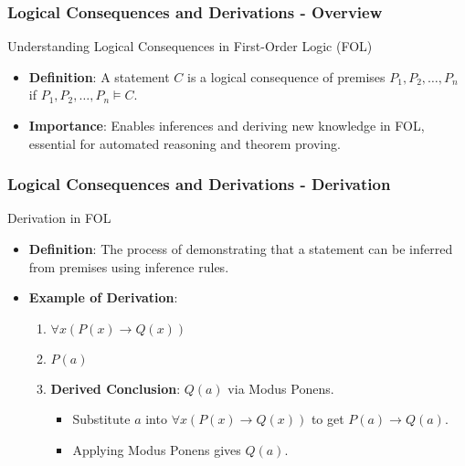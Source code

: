 \documentclass[aspectratio=169]{beamer}
\begin{document}
\begin{frame}[fragile]
    \frametitle{Logical Consequences and Derivations - Overview}
    \begin{block}{Understanding Logical Consequences in First-Order Logic (FOL)}
        \begin{itemize}
            \item \textbf{Definition}: A statement \(C\) is a logical consequence of premises \(P_1, P_2, \ldots, P_n\) if \( P_1, P_2, \ldots, P_n \models C \).
            \item \textbf{Importance}: Enables inferences and deriving new knowledge in FOL, essential for automated reasoning and theorem proving.
        \end{itemize}
    \end{block}
\end{frame}

\begin{frame}[fragile]
    \frametitle{Logical Consequences and Derivations - Derivation}
    \begin{block}{Derivation in FOL}
        \begin{itemize}
            \item \textbf{Definition}: The process of demonstrating that a statement can be inferred from premises using inference rules.
            \item \textbf{Example of Derivation}:
                \begin{enumerate}
                    \item \(\forall x (P(x) \rightarrow Q(x))\)
                    \item \(P(a)\)
                    \item \textbf{Derived Conclusion}: \(Q(a)\) via Modus Ponens.
                    \begin{itemize}
                        \item Substitute \(a\) into \(\forall x (P(x) \rightarrow Q(x))\) to get \(P(a) \rightarrow Q(a)\).
                        \item Applying Modus Ponens gives \(Q(a)\).
                    \end{itemize}
                \end{enumerate}
        \end{itemize}
    \end{block}
\end{frame}
\end{document}
